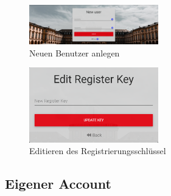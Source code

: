 \begin{figure}[H]
	\centering
	\includegraphics[width=0.5\textwidth, keepaspectratio]{img/guide/NewUser.png}
	\captionsetup{justification=centering, format=plain}
	\caption[Neuen Benutzer anlegen]{Neuen Benutzer anlegen \\\quelleScreenshot}
	\label{fig:NeuenBenutzerAnlegen}
\end{figure}


\begin{figure}[H]
	\centering
	\includegraphics[width=0.5\textwidth, keepaspectratio]{img/guide/EditRegisterKey.png}
	\captionsetup{justification=centering, format=plain}
	\caption[Editieren des Registrierungsschlüssel]{Editieren des Registrierungsschlüssel \\\quelleScreenshot}
	\label{fig:EditRegisterKey}
\end{figure}



\subsection{Eigener Account}
\label{ssec:EigenerAccount}

